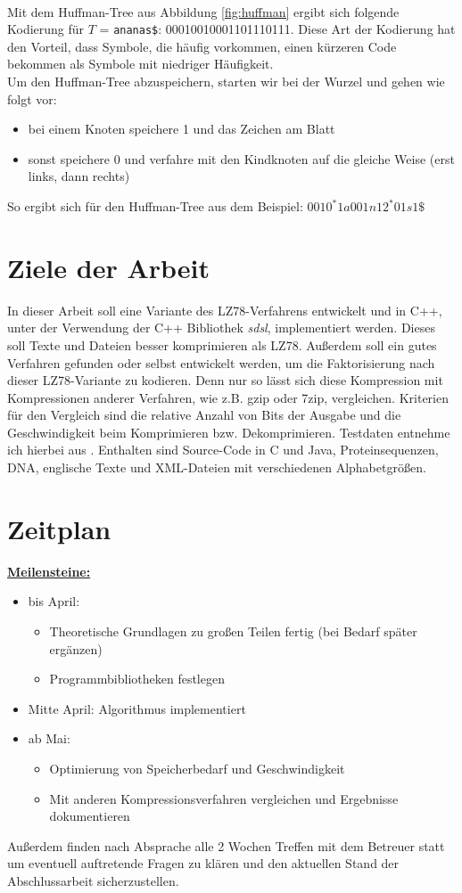 \documentclass[a4paper,11pt]{scrartcl}%
\theoremstyle{change}
\theoremstyle{nonumberplain}
\theoremstyle{change}
\theoremstyle{nonumberplain}
\theoremstyle{change}
\theoremstyle{nonumberplain}
\begin{document}
	\\Mit dem Huffman-Tree aus Abbildung \ref{fig:huffman}  ergibt sich folgende Kodierung für $T$ = \texttt{ananas\$}:
	00010010001101110111.
	Diese Art der Kodierung hat den Vorteil, dass Symbole, die häufig vorkommen, einen kürzeren Code bekommen als Symbole mit niedriger Häufigkeit.
	\\Um den Huffman-Tree abzuspeichern, starten wir bei der Wurzel und gehen wie folgt vor:
	\begin{itemize}
		\item bei einem Knoten speichere 1 und das Zeichen am Blatt
		\item sonst speichere 0 und verfahre mit den Kindknoten auf die gleiche Weise (erst links, dann rechts)
	\end{itemize}
	
	So ergibt sich für den Huffman-Tree aus dem Beispiel: $0010^*1a001n12^*01s1\$$
	\section{Ziele der Arbeit}
	
	In dieser Arbeit soll eine Variante des LZ78-Verfahrens entwickelt und in C++, unter der Verwendung der C++ Bibliothek \textit{sdsl}, implementiert werden. Dieses soll Texte und Dateien besser komprimieren als LZ78. Außerdem soll ein gutes Verfahren gefunden oder selbst entwickelt werden, um die Faktorisierung nach dieser LZ78-Variante zu kodieren. Denn nur so lässt sich diese Kompression mit Kompressionen anderer Verfahren, wie z.B. gzip oder 7zip, vergleichen. Kriterien für den Vergleich sind die relative Anzahl von Bits der Ausgabe und die Geschwindigkeit beim Komprimieren bzw. Dekomprimieren. Testdaten entnehme ich hierbei aus \cite{textcollection}. Enthalten sind Source-Code in C und Java, Proteinsequenzen, DNA, englische Texte und XML-Dateien mit verschiedenen Alphabetgrößen. 
	\newpage
	\section{Zeitplan}
	\textbf{\underline{Meilensteine:}}
	\begin{itemize}
		\item bis April: \begin{itemize}
		\item Theoretische Grundlagen zu großen Teilen fertig (bei Bedarf später ergänzen)
		\item Programmbibliotheken festlegen
		\end{itemize}
			\item Mitte April: Algorithmus implementiert
			\item ab Mai: 
		\begin{itemize}
			\item Optimierung von Speicherbedarf und Geschwindigkeit
			\item Mit anderen Kompressionsverfahren vergleichen und Ergebnisse dokumentieren
		\end{itemize}
	\end{itemize}	
	Außerdem finden nach Absprache alle 2 Wochen Treffen mit dem Betreuer statt um eventuell auftretende Fragen zu klären und den aktuellen Stand der Abschlussarbeit sicherzustellen.
	
	
	
	\newpage
	\nocite{*}
	

	
	
\end{document}
